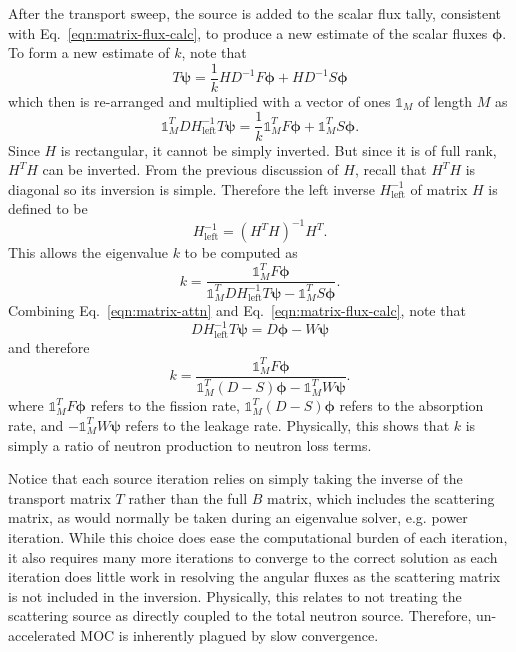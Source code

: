 After the transport sweep, the source is added to the scalar flux tally, consistent with Eq.~\ref{eqn:matrix-flux-calc}, to produce a new estimate of the scalar fluxes $\boldsymbol{\phi}$. To form a new estimate of $k$, note that
\begin{equation}
T \boldsymbol{\psi} = \frac{1}{k} H D^{-1} F \boldsymbol{\phi} + H D^{-1} S \boldsymbol{\phi}
\end{equation}
which then is re-arranged and multiplied with a vector of ones $\mathbb{1}_M$ of length $M$ as
\begin{equation}
\mathbb{1}_M^T D H_{\text{left}}^{-1} T \boldsymbol{\psi}  = \frac{1}{k} \mathbb{1}_M^T  F \boldsymbol{\phi} + \mathbb{1}_M^T  S \boldsymbol{\phi}.
\end{equation}
Since $H$ is rectangular, it cannot be simply inverted. But since it is of full rank, $H^T H$ can be inverted. From the previous discussion of $H$, recall that $H^T H$ is diagonal so its inversion is simple. Therefore the left inverse $H_{\text{left}}^{-1}$ of matrix $H$ is defined to be
\begin{equation}
H_{\text{left}}^{-1} = \left(H^T H\right)^{-1} H^T.
\end{equation}
This allows the eigenvalue $k$ to be computed as
\begin{equation}
k = \frac{\mathbb{1}_M^T F \boldsymbol{\phi}}{\mathbb{1}_M^T  D H_{\text{left}}^{-1} T \boldsymbol{\psi} - \mathbb{1}_M^T S \boldsymbol{\phi}}.
\end{equation}
Combining Eq.~\ref{eqn:matrix-attn} and Eq.~\ref{eqn:matrix-flux-calc}, note that
\begin{equation}
D H_{\text{left}}^{-1} T \boldsymbol{\psi} = D \boldsymbol{\phi} - W \boldsymbol{\psi}
\end{equation}
and therefore
\begin{equation}
k = \frac{\mathbb{1}_M^T F \boldsymbol{\phi}}{\mathbb{1}_M^T \left(D - S \right) \boldsymbol{\phi} - \mathbb{1}_M^T W \boldsymbol{\psi}}.
\end{equation}
where $\mathbb{1}_M^T F \boldsymbol{\phi}$ refers to the fission rate, $\mathbb{1}_M^T \left(D - S \right) \boldsymbol{\phi}$ refers to the absorption rate, and $-\mathbb{1}_M^T W \boldsymbol{\psi}$ refers to the leakage rate. Physically, this shows that $k$ is simply a ratio of neutron production to neutron loss terms.

Notice that each source iteration relies on simply taking the inverse of the transport matrix $T$ rather than the full $B$ matrix, which includes the scattering matrix, as would normally be taken during an eigenvalue solver, e.g. power iteration. While this choice does ease the computational burden of each iteration, it also requires many more iterations to converge to the correct solution as each iteration does little work in resolving the angular fluxes as the scattering matrix is not included in the inversion. Physically, this relates to not treating the scattering source as directly coupled to the total neutron source. Therefore, un-accelerated MOC is inherently plagued by slow convergence. 

